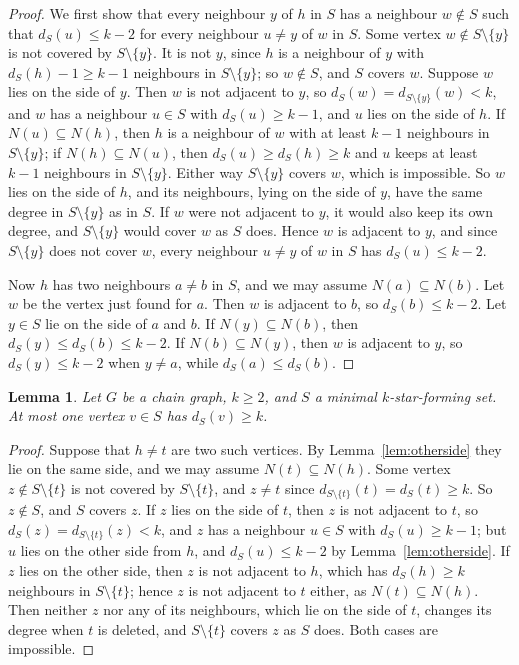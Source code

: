 \documentclass[11pt]{amsart}
\newtheorem{lemma}[theorem]{Lemma}
\theoremstyle{definition}
\theoremstyle{remark}
\begin{document}
\begin{proof}
We first show that every neighbour $y$ of $h$ in $S$ has a neighbour $w\notin S$ such that $d_S(u)\le k-2$ for every neighbour $u\ne y$ of $w$ in $S$. Some vertex $w\notin S\setminus\{y\}$ is not covered by $S\setminus\{y\}$. It is not $y$, since $h$ is a neighbour of $y$ with $d_S(h)-1\ge k-1$ neighbours in $S\setminus\{y\}$; so $w\notin S$, and $S$ covers $w$. Suppose $w$ lies on the side of $y$. Then $w$ is not adjacent to $y$, so $d_S(w)=d_{S\setminus\{y\}}(w)<k$, and $w$ has a neighbour $u\in S$ with $d_S(u)\ge k-1$, and $u$ lies on the side of $h$. If $N(u)\subseteq N(h)$, then $h$ is a neighbour of $w$ with at least $k-1$ neighbours in $S\setminus\{y\}$; if $N(h)\subseteq N(u)$, then $d_S(u)\ge d_S(h)\ge k$ and $u$ keeps at least $k-1$ neighbours in $S\setminus\{y\}$. Either way $S\setminus\{y\}$ covers $w$, which is impossible. So $w$ lies on the side of $h$, and its neighbours, lying on the side of $y$, have the same degree in $S\setminus\{y\}$ as in $S$. If $w$ were not adjacent to $y$, it would also keep its own degree, and $S\setminus\{y\}$ would cover $w$ as $S$ does. Hence $w$ is adjacent to $y$, and since $S\setminus\{y\}$ does not cover $w$, every neighbour $u\ne y$ of $w$ in $S$ has $d_S(u)\le k-2$.

Now $h$ has two neighbours $a\ne b$ in $S$, and we may assume $N(a)\subseteq N(b)$. Let $w$ be the vertex just found for $a$. Then $w$ is adjacent to $b$, so $d_S(b)\le k-2$. Let $y\in S$ lie on the side of $a$ and $b$. If $N(y)\subseteq N(b)$, then $d_S(y)\le d_S(b)\le k-2$. If $N(b)\subseteq N(y)$, then $w$ is adjacent to $y$, so $d_S(y)\le k-2$ when $y\ne a$, while $d_S(a)\le d_S(b)$.
\end{proof}

\begin{lemma}\label{lem:unique}
Let $G$ be a chain graph, $k\ge2$, and $S$ a minimal $k$-star-forming set. At most one vertex $v\in S$ has $d_S(v)\ge k$.
\end{lemma}

\begin{proof}
Suppose that $h\ne t$ are two such vertices. By Lemma~\ref{lem:otherside} they lie on the same side, and we may assume $N(t)\subseteq N(h)$. Some vertex $z\notin S\setminus\{t\}$ is not covered by $S\setminus\{t\}$, and $z\ne t$ since $d_{S\setminus\{t\}}(t)=d_S(t)\ge k$. So $z\notin S$, and $S$ covers $z$. If $z$ lies on the side of $t$, then $z$ is not adjacent to $t$, so $d_S(z)=d_{S\setminus\{t\}}(z)<k$, and $z$ has a neighbour $u\in S$ with $d_S(u)\ge k-1$; but $u$ lies on the other side from $h$, and $d_S(u)\le k-2$ by Lemma~\ref{lem:otherside}. If $z$ lies on the other side, then $z$ is not adjacent to $h$, which has $d_S(h)\ge k$ neighbours in $S\setminus\{t\}$; hence $z$ is not adjacent to $t$ either, as $N(t)\subseteq N(h)$. Then neither $z$ nor any of its neighbours, which lie on the side of $t$, changes its degree when $t$ is deleted, and $S\setminus\{t\}$ covers $z$ as $S$ does. Both cases are impossible.
\end{proof}
\end{document}
